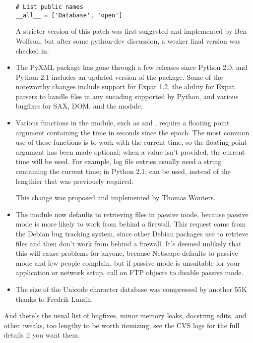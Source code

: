 \documentclass{howto}
\begin{document}
\begin{itemize}
\begin{verbatim}
# List public names
__all__ = ['Database', 'open']
\end{verbatim}

A stricter version of this patch was first suggested and implemented
by Ben Wolfson, but after some python-dev discussion, a weaker
final version was checked in.

\item The PyXML package has gone through a few releases since Python
2.0, and Python 2.1 includes an updated version of the 
package.  Some of the noteworthy changes include support for Expat
1.2, the ability for Expat parsers to handle files in any encoding
supported by Python, and various bugfixes for SAX, DOM, and the
 module.

\item Various functions in the  module, such as
 and ,
require a floating point argument containing the time in seconds since
the epoch.  The most common use of these functions is to work with the
current time, so the floating point argument has been made optional;
when a value isn't provided, the current time will be used.  For
example, log file entries usually need a string containing the current
time; in Python 2.1,  can be used, instead of the
lengthier  that was
previously required.
 
This change was proposed and implemented by Thomas Wouters.

\item The  module now defaults to retrieving files in passive mode,
because passive mode is more likely to work from behind a firewall.
This request came from the Debian bug tracking system, since other
Debian packages use  to retrieve files and then don't
work from behind a firewall.  It's deemed unlikely that this will
cause problems for anyone, because Netscape defaults to passive mode
and few people complain, but if passive mode is unsuitable for your
application or network setup, call
 on FTP objects to disable passive mode.  

\item The size of the Unicode character database was compressed by another 55K thanks to Fredrik Lundh.

\end{itemize}

And there's the usual list of bugfixes, minor memory leaks, docstring
edits, and other tweaks, too lengthy to be worth itemizing; see the
CVS logs for the full details if you want them.
\end{document}
